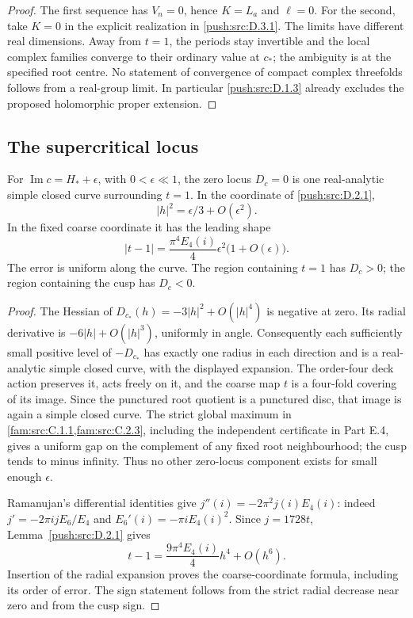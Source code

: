 \begin{proof}
The first sequence has \(V_n=0\), hence \(K=L_a\) and \(\ell=0\).
For the second, take \(K=0\) in the explicit realization in \ref{push:src:D.3.1}.
The limits have different real dimensions. Away from \(t=1\), the
periods stay invertible and the local complex families converge to
their ordinary value at \(c_*\); the ambiguity is at the specified
root centre. No statement of convergence of compact complex
threefolds follows from a real-group limit. In particular \ref{push:src:D.1.3}
already excludes the proposed holomorphic proper extension.
\end{proof}

\subsection{The supercritical locus}\label{push:section:D.4}

\begin{proposition}\label{push:src:D.4.1}
For \(\operatorname{Im}c=H_*+\epsilon\), with
\(0<\epsilon\ll1\), the zero locus \(D_c=0\) is one real-analytic
simple closed curve surrounding \(t=1\). In the coordinate of \ref{push:src:D.2.1},
\[
 |h|^2=\epsilon/3+O(\epsilon^2).
\]
In the fixed coarse coordinate it has the leading shape
\[
 |t-1|=\frac{\pi^4E_4(i)}4\epsilon^2
                         \bigl(1+O(\epsilon)\bigr).
\]
The error is uniform along the curve. The region containing \(t=1\)
has \(D_c>0\); the region containing the cusp has \(D_c<0\).
\end{proposition}

\begin{proof}
The Hessian of \(D_{c_*}(h)=-3|h|^2+O(|h|^4)\) is negative
at zero. Its radial derivative is \(-6|h|+O(|h|^3)\), uniformly
in angle. Consequently each sufficiently small positive level of
\(-D_{c_*}\) has exactly one radius in each direction and is a
real-analytic simple closed curve, with the displayed expansion.
The order-four deck action preserves it, acts freely on it, and the
coarse map \(t\) is a four-fold covering of its image. Since the
punctured root quotient is a punctured disc, that image is again a
simple closed curve. The strict global maximum in \cref{fam:src:C.1.1,fam:src:C.2.3}, including the
independent certificate in Part E.4, gives a uniform gap on the
complement of any fixed root neighbourhood; the cusp tends to minus
infinity. Thus no other zero-locus component exists for small enough
\(\epsilon\).

Ramanujan's differential identities give
\(j''(i)=-2\pi^2j(i)E_4(i)\): indeed
\(j'=-2\pi i jE_6/E_4\) and
\(E_6'(i)=-\pi iE_4(i)^2\). Since \(j=1728t\), Lemma~\ref{push:src:D.2.1} gives
\[
 t-1=\frac{9\pi^4E_4(i)}4h^4+O(h^6).
\]
Insertion of the radial expansion proves the coarse-coordinate
formula, including its order of error. The sign statement follows
from the strict radial decrease near zero and from the cusp sign.
\end{proof}

